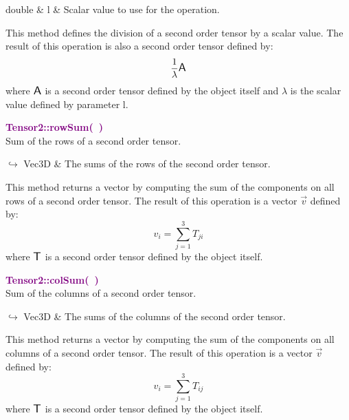 \begin{tcolorbox}[width=\textwidth,myArgs,tabularx={ll|R}]
double & l & Scalar value to use for the operation.
\end{tcolorbox}

This method defines the division of a second order tensor by a scalar value.
The result of this operation is also a second order tensor defined by:
\begin{equation*}
\frac{1}{\lambda} \mbox{\large\ensuremath{\mathsf{A}}}
\end{equation*}
where $\mbox{\large\ensuremath{\mathsf{A}}}$ is a second order tensor defined by the object itself and $\lambda$ is the scalar value defined by parameter l.

\textcolor{purple}{\textbf{Tensor2::rowSum(~)}}\label{Tensor2::rowSum()}\\
Sum of the rows of a second order tensor.\vspace*{-0.5em}
\begin{tcolorbox}[grow to left by=-1cm, width=\textwidth-1cm,myArgs,tabularx={l|R}]
$\hookrightarrow$ Vec3D & The sums of the rows of the second order tensor.
\end{tcolorbox}

This method returns a vector by computing the sum of the components on all rows of a second order tensor.
The result of this operation is a vector $\overrightarrow{v}$ defined by:
\begin{equation*}
v_{i}=\sum_{j=1}^{3} T_{ji}
\end{equation*}
where $\mbox{\large\ensuremath{\mathsf{T}}}$ is a second order tensor defined by the object itself.

\textcolor{purple}{\textbf{Tensor2::colSum(~)}}\label{Tensor2::colSum()}\\
Sum of the columns of a second order tensor.\vspace*{-0.5em}
\begin{tcolorbox}[grow to left by=-1cm, width=\textwidth-1cm,myArgs,tabularx={l|R}]
$\hookrightarrow$ Vec3D & The sums of the columns of the second order tensor.
\end{tcolorbox}

This method returns a vector by computing the sum of the components on all columns of a second order tensor.
The result of this operation is a vector $\overrightarrow{v}$ defined by:
\begin{equation*}
v_{i}=\sum_{j=1}^{3}T_{ij}
\end{equation*}
where $\mbox{\large\ensuremath{\mathsf{T}}}$ is a second order tensor defined by the object itself.

